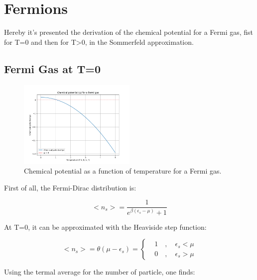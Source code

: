 \documentclass{article}
\begin{document}
\section{Fermions}

Hereby it's presented the derivation of the chemical potential for a Fermi gas,
fist for T=0 and then for T>0, in the Sommerfeld approximation.

\subsection{Fermi Gas at T=0}

\begin{figure}[h]
    \centering
    \includegraphics[width=0.5\textwidth]{images/mu-fermions.png}
    \caption{Chemical potential as a function of temperature for a Fermi gas.}
    \label{fig:mu-fermions}
\end{figure}

First of all, the Fermi-Dirac distribution is:

\begin{equation}
    <n_s>=\frac{1}{e^{\beta(\epsilon_s-\mu)}+1}
\end{equation}

At T=0, it can be approximated with the Heaviside step function:

\begin{equation}
    <n_s>=\theta(\mu-\epsilon_s)=
    \left\{
    \begin{aligned}
         & 1 \quad , \quad \epsilon_s<\mu \\
         & 0 \quad , \quad \epsilon_s>\mu
    \end{aligned}
    \right.
\end{equation}

Using the termal average for the number of particle, one finds:
\end{document}

